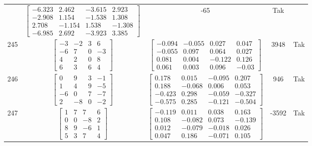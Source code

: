 \documentclass[a4paper,12pt]{article}
\begin{document}
\begin{tabular}{c c c c c}
&
$\begin{bmatrix} -6.323 & 2.462 & -3.615 & 2.923 \\ -2.908 & 1.154 & -1.538 & 1.308 \\ 2.708 & -1.154 & 1.538 & -1.308 \\ -6.985 & 2.692 & -3.923 & 3.385 \end{bmatrix}$
&
-65
&
Tak
\\
245
&
$\begin{bmatrix} -3 & -2 & 3 & 6 \\ -6 & 7 & 0 & -3 \\ 4 & 2 & 0 & 8 \\ 6 & 3 & 6 & 4 \end{bmatrix}$
&
$\begin{bmatrix} -0.094 & -0.055 & 0.027 & 0.047 \\ -0.055 & 0.097 & 0.064 & 0.027 \\ 0.081 & 0.004 & -0.122 & 0.126 \\ 0.061 & 0.003 & 0.096 & -0.03 \end{bmatrix}$
&
3948
&
Tak
\\
246
&
$\begin{bmatrix} 0 & 9 & 3 & -1 \\ 1 & 4 & 9 & -5 \\ -6 & 0 & 7 & -7 \\ 2 & -8 & 0 & -2 \end{bmatrix}$
&
$\begin{bmatrix} 0.178 & 0.015 & -0.095 & 0.207 \\ 0.188 & -0.068 & 0.006 & 0.053 \\ -0.423 & 0.298 & -0.059 & -0.327 \\ -0.575 & 0.285 & -0.121 & -0.504 \end{bmatrix}$
&
946
&
Tak
\\
247
&
$\begin{bmatrix} 1 & 7 & 7 & 6 \\ 0 & 0 & -8 & 2 \\ 8 & 9 & -6 & 1 \\ 5 & 3 & 7 & 4 \end{bmatrix}$
&
$\begin{bmatrix} -0.119 & 0.011 & 0.038 & 0.163 \\ 0.108 & -0.082 & 0.073 & -0.139 \\ 0.012 & -0.079 & -0.018 & 0.026 \\ 0.047 & 0.186 & -0.071 & 0.105 \end{bmatrix}$
&
-3592
&
Tak
\\

\end{tabular}
\end{document}
